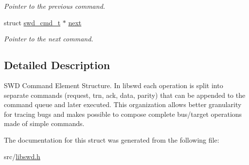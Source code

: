 \begin{DoxyCompactItemize}
\begin{DoxyCompactList}\small\item\em Pointer to the previous command. \item\end{DoxyCompactList}\item 
\hypertarget{structswd__cmd__t_aaf05bcb291fe2ecdf38a9168315db405}{
struct \hyperlink{structswd__cmd__t}{swd\_\-cmd\_\-t} $\ast$ \hyperlink{structswd__cmd__t_aaf05bcb291fe2ecdf38a9168315db405}{next}}
\label{structswd__cmd__t_aaf05bcb291fe2ecdf38a9168315db405}

\begin{DoxyCompactList}\small\item\em Pointer to the next command. \item\end{DoxyCompactList}\end{DoxyCompactItemize}


\subsection{Detailed Description}
SWD Command Element Structure. In libswd each operation is split into separate commands (request, trn, ack, data, parity) that can be appended to the command queue and later executed. This organization allows better granularity for tracing bugs and makes possible to compose complete bus/target operations made of simple commands. 

The documentation for this struct was generated from the following file:\begin{DoxyCompactItemize}
\item 
src/\hyperlink{libswd_8h}{libswd.h}\end{DoxyCompactItemize}
